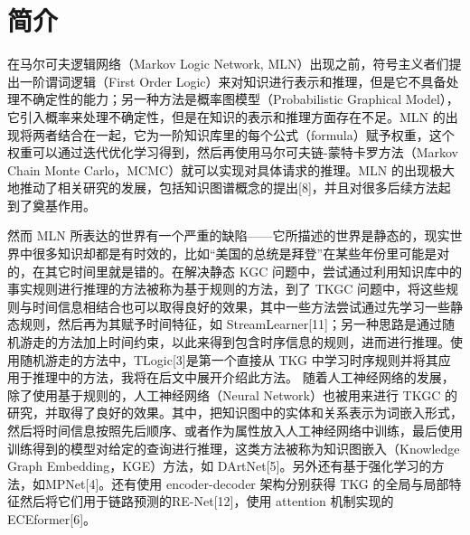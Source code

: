 \documentclass[a4paper, AutoFakeBold]{article}
\title{\mytitle}
\author{宋超}
\date{\today}
\begin{document}
\maketitle

\setcounter{page}{1}
\begin{abstract}
自知识图谱（Knowledge Graph, KG）的概念提出以来，各大企业、机构纷纷利用知识图谱构建了庞大的知识库（Knowledge Base, KB）。但是由于知识库的不完备性，如何利用已有知识预测缺失的知识，从而完善知识库这个问题被提了出来，进而出现了知识图完备（Knowledge Graph Completion, KGC）相关的研究。然而现实世界中的知识往往不是一成不变的，于是近年来又出现了带时间信息的知识库（Temporal Knowledge Base, TKB），以及相应的时序知识图完备[2]（Temporal Knowledge Graph Completion, TKGC，或称时序知识图推理[7] Temporal Knowledge Graph Reasoning，TKGR）相关的研究。本文通过调研目前主流的研究方法与分类方式，选择了我们认为具有代表性的三个框架 TLogic, MPNet, ECEformer 来介绍当前 TKGC 的最新进展。
\end{abstract}

\section{简介}

在马尔可夫逻辑网络（Markov Logic Network, MLN）出现之前，符号主义者们提出一阶谓词逻辑（First Order Logic）来对知识进行表示和推理，但是它不具备处理不确定性的能力；另一种方法是概率图模型（Probabilistic Graphical Model），它引入概率来处理不确定性，但是在知识的表示和推理方面存在不足。MLN 的出现将两者结合在一起，它为一阶知识库里的每个公式（formula）赋予权重，这个权重可以通过迭代优化学习得到，然后再使用马尔可夫链-蒙特卡罗方法（Markov Chain Monte Carlo，MCMC）就可以实现对具体请求的推理\cite{marzano2007rainfall}。MLN 的出现极大地推动了相关研究的发展，包括知识图谱概念的提出[8]，并且对很多后续方法起到了奠基作用。

然而 MLN 所表达的世界有一个严重的缺陷——它所描述的世界是静态的，现实世界中很多知识却都是有时效的，比如“美国的总统是拜登”在某些年份里可能是对的，在其它时间里就是错的。在解决静态 KGC 问题中，尝试通过利用知识库中的事实规则进行推理的方法被称为基于规则的方法，到了 TKGC 问题中，将这些规则与时间信息相结合也可以取得良好的效果，其中一些方法尝试通过先学习一些静态规则，然后再为其赋予时间特征，如 StreamLearner[11]；另一种思路是通过随机游走的方法加上时间约束，以此来得到包含时序信息的规则，进而进行推理。使用随机游走的方法中，TLogic[3]是第一个直接从 TKG 中学习时序规则并将其应用于推理中的方法，我将在后文中展开介绍此方法。
随着人工神经网络的发展，除了使用基于规则的，人工神经网络（Neural Network）也被用来进行 TKGC 的研究，并取得了良好的效果。其中，把知识图中的实体和关系表示为词嵌入形式，然后将时间信息按照先后顺序、或者作为属性放入人工神经网络中训练，最后使用训练得到的模型对给定的查询进行推理，这类方法被称为知识图嵌入（Knowledge Graph Embedding，KGE）方法，如 DArtNet[5]。另外还有基于强化学习的方法，如MPNet[4]。还有使用 encoder-decoder 架构分别获得 TKG 的全局与局部特征然后将它们用于链路预测的RE-Net[12]，使用 attention 机制实现的ECEformer[6]。
\end{document}
